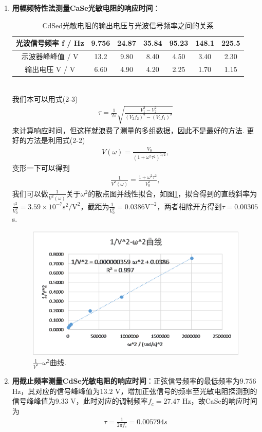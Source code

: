 \documentclass[UTF8,10pt,a4paper]{article}
\begin{document}
\begin{enumerate}
    \item \textbf{用幅频特性法测量CaSe光敏电阻的响应时间}：
    \begin{table}[h]
        \centering
        \caption{CdSed光敏电阻的输出电压与光波信号频率之间的关系}
        \label{2-T-3}
        \begin{tabular}{|c|c|c|c|c|c|c|}
        \hline
        光波信号频率 f / Hz & 9.756 & 24.87 & 35.84 & 95.23 & 148.1 & 225.5 \\ \hline
        示波器峰峰值 / V & 13.2 & 9.80 & 8.40 & 4.50 & 3.40 & 2.30 \\ \hline
        输出电压 V / V & 6.60 & 4.90 & 4.20 & 2.25 & 1.70 & 1.15 \\ \hline
        \end{tabular}
        \end{table}
        \\我们本可以用式(2-3)
        \begin{align}
            \tau=\frac{1}{2\pi}\sqrt{\frac{V_1^2-V_2^2}{(V_2f_2)^2-(V_1f_1)^2}}
        \end{align}
        来计算响应时间，但这样就浪费了测量的多组数据，因此不是最好的方法. 更好的方法是利用式(2-2)
        \begin{align}
            V(\omega)=\frac{V_0}{(1+\omega^2\tau^2)^{1/2}},
        \end{align}
        变形一下可以得到
        \begin{align}
            \frac{1}{V^2(\omega)}=\frac{1+\omega^2\tau^2}{V_0^2},
        \end{align}
        我们可以做$\frac{1}{V^2(\omega)}$关于$\omega^2$的散点图并线性拟合，如图\ref{2-F-3}，拟合得到的直线斜率为$\frac{\tau^2}{V_0^2}=3.59\times 10^{-7}\text{s}^2/\text{V}^2$，截距为$\frac{1}{V_0^2}=0.0386\text{V}^{-2}$，两者相除开方得到$\tau=0.00305$s.
        \begin{figure}[h]
            \centering
            \includegraphics[width=.45\textwidth]{2-F-3.png}
            \caption{$\frac{1}{V^2}$--$\omega^2$曲线.}
            \label{2-F-3}
        \end{figure}
        \item \textbf{用截止频率测量CdSe光敏电阻的响应时间}：正弦信号频率的最低频率为$9.756$ Hz，其对应的信号峰峰值为$13.2$ V，增加正弦信号的频率至光敏电阻探测到的信号峰峰值为$9.33$ V，此时对应的调制频率$f_c=27.47$ Hz，故CaSe的响应时间为
        \begin{align}
            \tau=\frac{1}{2\pi f_c}=0.005794s
        \end{align}
\end{enumerate}
\end{document}
